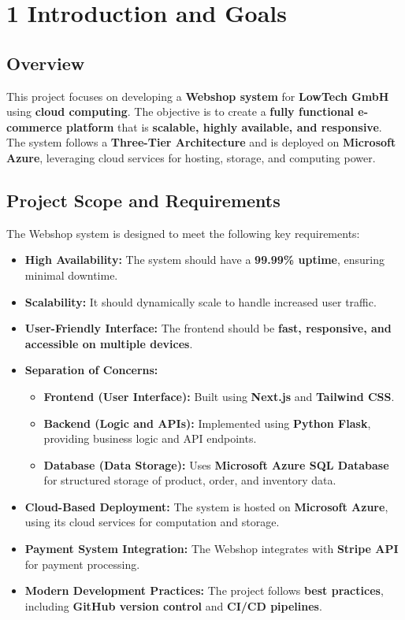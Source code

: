 \hypertarget{introduction-and-goals}{%
\section{1 Introduction and Goals}\label{section-introduction-and-goals}}

\subsection{Overview}
This project focuses on developing a \textbf{Webshop system} for \textbf{LowTech GmbH} using \textbf{cloud computing}. The objective is to create a \textbf{fully functional e-commerce platform} that is \textbf{scalable, highly available, and responsive}. The system follows a \textbf{Three-Tier Architecture} and is deployed on \textbf{Microsoft Azure}, leveraging cloud services for hosting, storage, and computing power.

\subsection{Project Scope and Requirements}
The Webshop system is designed to meet the following key requirements:

\begin{itemize}
    \item \textbf{High Availability:} The system should have a \textbf{99.99\% uptime}, ensuring minimal downtime.
    \item \textbf{Scalability:} It should dynamically scale to handle increased user traffic.
    \item \textbf{User-Friendly Interface:} The frontend should be \textbf{fast, responsive, and accessible on multiple devices}.
    \item \textbf{Separation of Concerns:}
    \begin{itemize}
        \item \textbf{Frontend (User Interface):} Built using \textbf{Next.js} and \textbf{Tailwind CSS}.
        \item \textbf{Backend (Logic and APIs):} Implemented using \textbf{Python Flask}, providing business logic and API endpoints.
        \item \textbf{Database (Data Storage):} Uses \textbf{Microsoft Azure SQL Database} for structured storage of product, order, and inventory data.
    \end{itemize}
    \item \textbf{Cloud-Based Deployment:} The system is hosted on \textbf{Microsoft Azure}, using its cloud services for computation and storage.
    \item \textbf{Payment System Integration:} The Webshop integrates with \textbf{Stripe API} for payment processing.
    \item \textbf{Modern Development Practices:} The project follows \textbf{best practices}, including \textbf{GitHub version control} and \textbf{CI/CD pipelines}.
\end{itemize}

